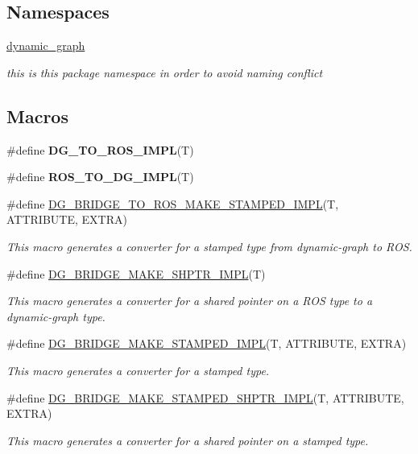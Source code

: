 \subsection*{Namespaces}
\begin{DoxyCompactItemize}
\item 
 \hyperlink{namespacedynamic__graph}{dynamic\+\_\+graph}
\begin{DoxyCompactList}\small\item\em this is this package namespace in order to avoid naming conflict \end{DoxyCompactList}\end{DoxyCompactItemize}
\subsection*{Macros}
\begin{DoxyCompactItemize}
\item 
\#define {\bfseries D\+G\+\_\+\+T\+O\+\_\+\+R\+O\+S\+\_\+\+I\+M\+PL}(T)
\item 
\#define {\bfseries R\+O\+S\+\_\+\+T\+O\+\_\+\+D\+G\+\_\+\+I\+M\+PL}(T)
\item 
\#define \hyperlink{converter_8hh_ae02c25236f7cecbfbdbf9cc9239cb785}{D\+G\+\_\+\+B\+R\+I\+D\+G\+E\+\_\+\+T\+O\+\_\+\+R\+O\+S\+\_\+\+M\+A\+K\+E\+\_\+\+S\+T\+A\+M\+P\+E\+D\+\_\+\+I\+M\+PL}(T,  A\+T\+T\+R\+I\+B\+U\+TE,  E\+X\+T\+RA)
\begin{DoxyCompactList}\small\item\em This macro generates a converter for a stamped type from dynamic-\/graph to R\+OS. \end{DoxyCompactList}\item 
\#define \hyperlink{converter_8hh_a9de018e745b4235be09aaab744557770}{D\+G\+\_\+\+B\+R\+I\+D\+G\+E\+\_\+\+M\+A\+K\+E\+\_\+\+S\+H\+P\+T\+R\+\_\+\+I\+M\+PL}(T)
\begin{DoxyCompactList}\small\item\em This macro generates a converter for a shared pointer on a R\+OS type to a dynamic-\/graph type. \end{DoxyCompactList}\item 
\#define \hyperlink{converter_8hh_a9ecac683e8b5794b8717b7d2d18c8b22}{D\+G\+\_\+\+B\+R\+I\+D\+G\+E\+\_\+\+M\+A\+K\+E\+\_\+\+S\+T\+A\+M\+P\+E\+D\+\_\+\+I\+M\+PL}(T,  A\+T\+T\+R\+I\+B\+U\+TE,  E\+X\+T\+RA)
\begin{DoxyCompactList}\small\item\em This macro generates a converter for a stamped type. \end{DoxyCompactList}\item 
\#define \hyperlink{converter_8hh_a2c8d741da8bc5978c852fb7b71ec26e7}{D\+G\+\_\+\+B\+R\+I\+D\+G\+E\+\_\+\+M\+A\+K\+E\+\_\+\+S\+T\+A\+M\+P\+E\+D\+\_\+\+S\+H\+P\+T\+R\+\_\+\+I\+M\+PL}(T,  A\+T\+T\+R\+I\+B\+U\+TE,  E\+X\+T\+RA)
\begin{DoxyCompactList}\small\item\em This macro generates a converter for a shared pointer on a stamped type. \end{DoxyCompactList}\end{DoxyCompactItemize}
